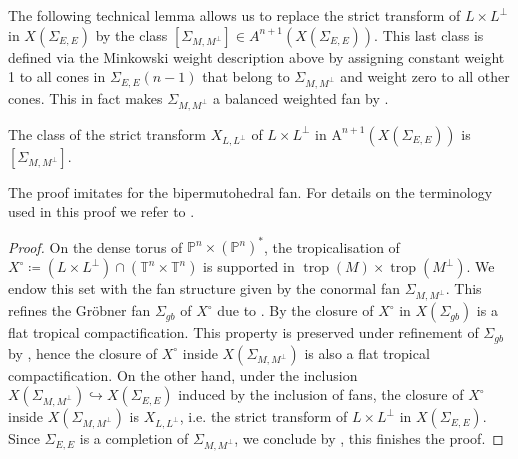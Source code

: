 \documentclass[12pt,a4paper,english]{scrartcl}
\newcommand{\PP}{\mathbb{P}}
\newcommand{\TT}{\mathbb{T}}
\DeclareMathOperator{\trop}{trop}
\newcommand{\ChowGrp}{\mathrm{A}}
\begin{document}
The following technical lemma allows us to replace the strict transform of $L\times L^\perp$ in $X(\Sigma_{E,E})$ by the class $[\Sigma_{M,M^\perp}]\in A^{n+1}(X(\Sigma_{E,E}))$. This last class is defined via the Minkowski weight description above by assigning constant weight 1 to all cones in $\Sigma_{E,E}(n-1)$ that belong to $\Sigma_{M,M^\perp}$ and weight zero to all other cones. This in fact makes $\Sigma_{M,M^\perp}$ a balanced weighted fan by \cite[Proposition 3.7]{Ardila2022}. 
\begin{lemma}
\label{lem:classofstricttransform}
    The class of the strict transform $X_{L,L^\perp}$  of $L\times L^\perp$ in $\ChowGrp^{n+1}(X(\Sigma_{E,E}))$ is $[\Sigma_{M,M^\perp}]$.
\end{lemma}
The proof imitates \cite[Lemma 9.8]{BEST2023} for the bipermutohedral fan. For details on the terminology used in this proof we refer to \cite{Maclagan2015}. 
\begin{proof}
On the dense torus of $\PP^n \times (\PP^n)^*$, the tropicalisation of $X^\circ \coloneq (L\times L^\perp)\cap (\TT^n\times \TT^n)$ is supported in $\trop(M)\times \trop(M^\perp)$. We endow this set with the fan structure given by the conormal fan $\Sigma_{M,M^\perp}$. This refines the Gröbner fan $\Sigma_{gb}$ of $X^\circ$ due to \cite[Exercise 4.7.(7)]{Maclagan2015}. By \cite[Proposition 6.4.17]{Maclagan2015} the closure of $X^\circ$ in $X(\Sigma_{gb})$ is a flat tropical compactification. This property is preserved under refinement of $\Sigma_{gb}$ by \cite[Proposition 6.4.14]{Maclagan2015}, hence the closure of $X^\circ$ inside $X(\Sigma_{M,M^\perp})$ is also a flat tropical compactification. On the other hand, under the inclusion $X(\Sigma_{M,M^\perp})\hookrightarrow X(\Sigma_{E,E})$ induced by the inclusion of fans, the closure of $X^\circ$ inside $X(\Sigma_{M,M^\perp})$ is $X_{L,L^\perp}$, i.e. the strict transform of $L\times L^\perp$ in $X(\Sigma_{E,E})$. Since $\Sigma_{E,E}$ is a completion of $\Sigma_{M,M^\perp}$, we conclude by \cite[Theorem 6.7.7]{Maclagan2015}, this finishes the proof.
\end{proof}
\end{document}
